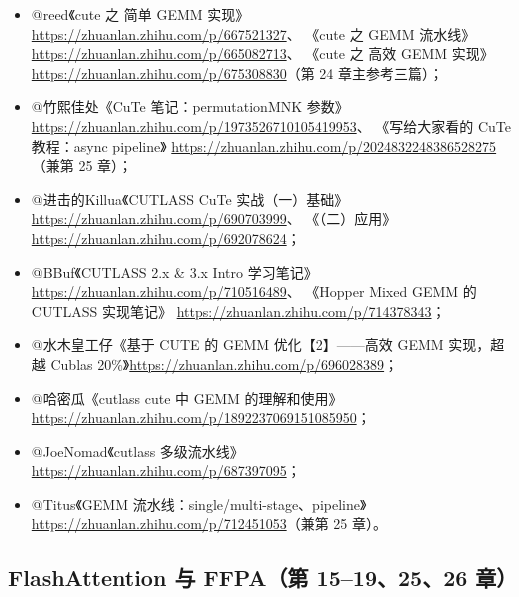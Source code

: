 \begin{itemize}
  \item @reed《cute 之 简单 GEMM 实现》
        \url{https://zhuanlan.zhihu.com/p/667521327}、
        《cute 之 GEMM 流水线》
        \url{https://zhuanlan.zhihu.com/p/665082713}、
        《cute 之 高效 GEMM 实现》
        \url{https://zhuanlan.zhihu.com/p/675308830}（第 24 章主参考三篇）；
  \item @竹熙佳处《CuTe 笔记：permutationMNK 参数》
        \url{https://zhuanlan.zhihu.com/p/1973526710105419953}、
        《写给大家看的 CuTe 教程：async pipeline》
        \url{https://zhuanlan.zhihu.com/p/2024832248386528275}（兼第 25 章）；
  \item @进击的Killua《CUTLASS CuTe 实战（一）基础》
        \url{https://zhuanlan.zhihu.com/p/690703999}、
        《（二）应用》\url{https://zhuanlan.zhihu.com/p/692078624}；
  \item @BBuf《CUTLASS 2.x \& 3.x Intro 学习笔记》
        \url{https://zhuanlan.zhihu.com/p/710516489}、
        《Hopper Mixed GEMM 的 CUTLASS 实现笔记》
        \url{https://zhuanlan.zhihu.com/p/714378343}；
  \item @水木皇工仔《基于 CUTE 的 GEMM 优化【2】——高效 GEMM 实现，超越
        Cublas 20\%》\url{https://zhuanlan.zhihu.com/p/696028389}；
  \item @哈密瓜《cutlass cute 中 GEMM 的理解和使用》
        \url{https://zhuanlan.zhihu.com/p/1892237069151085950}；
  \item @JoeNomad《cutlass 多级流水线》
        \url{https://zhuanlan.zhihu.com/p/687397095}；
  \item @Titus《GEMM 流水线：single/multi-stage、pipeline》
        \url{https://zhuanlan.zhihu.com/p/712451053}（兼第 25 章）。
\end{itemize}

\subsection{FlashAttention 与 FFPA（第 15--19、25、26 章）}

